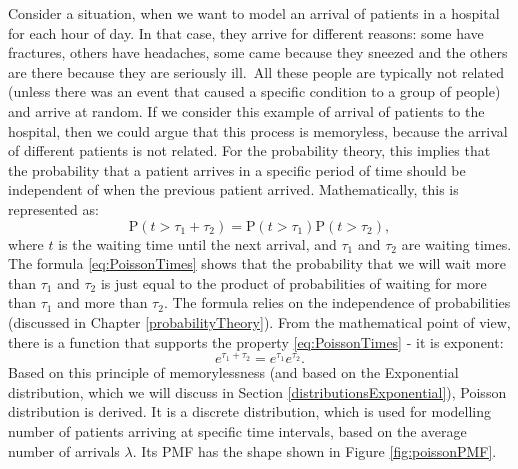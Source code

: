 \documentclass[
]{book}
\theoremstyle{definition}
\theoremstyle{definition}
\theoremstyle{definition}
\theoremstyle{definition}
\theoremstyle{remark}
\begin{document}
Consider a situation, when we want to model an arrival of patients in a hospital for each hour of day. In that case, they arrive for different reasons: some have fractures, others have headaches, some came because they sneezed and the others are there because they are seriously ill.~All these people are typically not related (unless there was an event that caused a specific condition to a group of people) and arrive at random. If we consider this example of arrival of patients to the hospital, then we could argue that this process is memoryless, because the arrival of different patients is not related. For the probability theory, this implies that the probability that a patient arrives in a specific period of time should be independent of when the previous patient arrived. Mathematically, this is represented as:
\begin{equation}
    \mathrm{P}(t > \tau_1 + \tau_2) = \mathrm{P}(t > \tau_1)\mathrm{P}(t > \tau_2),
    \label{eq:PoissonTimes}
\end{equation}
where \(t\) is the waiting time until the next arrival, and \(\tau_1\) and \(\tau_2\) are waiting times. The formula \eqref{eq:PoissonTimes} shows that the probability that we will wait more than \(\tau_1\) and \(\tau_2\) is just equal to the product of probabilities of waiting for more than \(\tau_1\) and more than \(\tau_2\). The formula relies on the independence of probabilities (discussed in Chapter \ref{probabilityTheory}). From the mathematical point of view, there is a function that supports the property \eqref{eq:PoissonTimes} - it is exponent:
\begin{equation}
    e^{\tau_1 + \tau_2} = e^{\tau_1} e^{\tau_2} .
    \label{eq:PoissonTimesExp}
\end{equation}
Based on this principle of memorylessness (and based on the Exponential distribution, which we will discuss in Section \ref{distributionsExponential}), Poisson distribution is derived. It is a discrete distribution, which is used for modelling number of patients arriving at specific time intervals, based on the average number of arrivals \(\lambda\). Its PMF has the shape shown in Figure \ref{fig:poissonPMF}.
\end{document}
